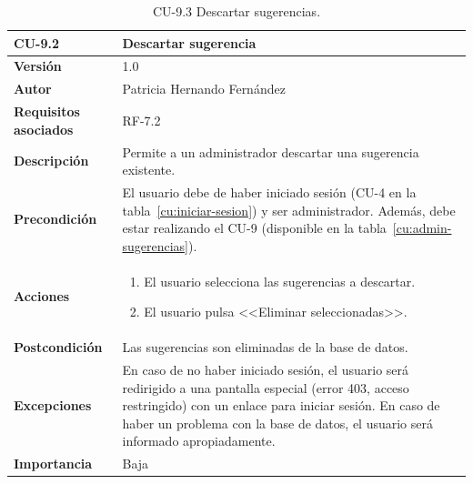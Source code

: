 \begin{table}[p]
	\centering
	\begin{tabularx}{\linewidth}{ p{} p{} }
		\toprule
		\textbf{CU-9.2}    & \textbf{Descartar sugerencia}\\
		\toprule
		\textbf{Versión}              & 1.0    \\
		\textbf{Autor}                & Patricia Hernando Fernández \\
		\textbf{Requisitos asociados} & RF-7.2 \\
		\textbf{Descripción}          & Permite a un administrador descartar una sugerencia existente.\\
		\textbf{Precondición}         & El usuario debe de haber iniciado sesión (CU-4 en la tabla~\ref{cu:iniciar-sesion}) y ser administrador. Además, debe estar realizando el CU-9 (disponible en la tabla~\ref{cu:admin-sugerencias}). \\
		\textbf{Acciones}             &
		\begin{enumerate}
			\def\labelenumi{\arabic{enumi}.}
			\tightlist
			\item El usuario selecciona las sugerencias a descartar.
			\item El usuario pulsa <<Eliminar seleccionadas>>.
		\end{enumerate}\\
		\textbf{Postcondición}        & Las sugerencias son eliminadas de la base de datos. \\
		\textbf{Excepciones}          & En caso de no haber iniciado sesión, el usuario será redirigido a una pantalla especial (error 403, acceso restringido) con un enlace para iniciar sesión. En caso de haber un problema con la base de datos, el usuario será informado apropiadamente.\\
		\textbf{Importancia}          & Baja \\
		\bottomrule
	\end{tabularx}
	\caption{CU-9.3 Descartar sugerencias.}
	\label{cu:descartar sugerencias}
\end{table}
